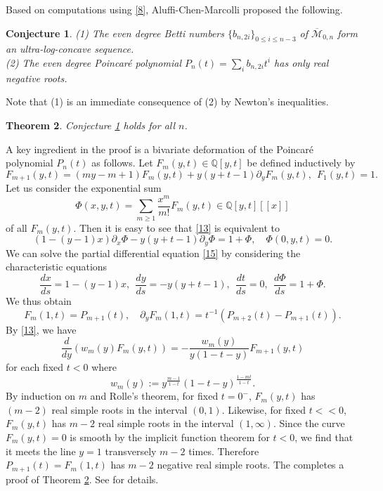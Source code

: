 \documentclass[11pt,letterpaper]{amsart}
\numberwithin{equation}{section}
\newtheorem{theorem}{Theorem}[section]
\newtheorem{conjecture}[theorem]{Conjecture}
\theoremstyle{definition}
\def\QQ{\mathbb{Q}}
\newcommand{\cal}{\mathcal}
\def\cM{{\cal M}}
\def\mzn{\overline{\cM}_{0,n} }
\def\beq{\begin{equation}}
\def\eeq{\end{equation}}
\begin{document}
Based on computations using \eqref{8}, Aluffi-Chen-Marcolli proposed the following.
\begin{conjecture}\label{12} \cite{ACM}
(1) The even degree Betti numbers $\{b_{n,2i}\}_{0\le i\le n-3}$ of $\mzn$ form an ultra-log-concave sequence. \\
(2) The even degree Poincar\'e polynomial $P_n(t)=\sum_i b_{n,2i}t^i$ has only real negative roots.
\end{conjecture}
Note that (1) is an immediate consequence of (2) by Newton's inequalities.

\begin{theorem}\label{14} \cite{BK}
    Conjecture \ref{12} holds for all $n$.
\end{theorem}


A key ingredient in the proof is a bivariate deformation of the Poincar\'e polynomial $P_n(t)$ as follows. Let $F_m(y,t) \in \QQ[y,t]$ be defined inductively by
\beq\label{13} F_{m+1}(y,t)=(my-m+1)F_m(y,t)+y(y+t-1)\partial_yF_m(y,t),\ \  F_1(y,t)=1.\eeq
Let us consider the exponential sum
\beq\label{16} \Phi(x,y,t)=\sum_{m\ge 1} \frac{x^m}{m!}F_m(y,t)\in \QQ[y,t][\![x]\!]\eeq
of all $F_m(y,t)$. Then it is easy to see that \eqref{13} is equivalent to
\beq\label{15}
(1-(y-1)x)\partial_x\Phi-y(y+t-1)\partial_y\Phi=1+\Phi,\quad \Phi(0,y,t)=0.\eeq
We can solve the partial differential equation \eqref{15} by considering the characteristic equations
\beq\label{17}
\frac{dx}{ds}=1-(y-1)x, \ \ \frac{dy}{ds}=-y(y+t-1), \ \ \frac{dt}{ds}=0, \ \  \frac{d\Phi}{ds} = 1+\Phi.
\eeq
We thus obtain
\beq\label{18}
F_m(1,t)=P_{m+1}(t),\quad \partial_yF_m(1,t)=t^{-1}\left( P_{m+2}(t)-P_{m+1}(t)  \right).\eeq
By \eqref{13}, we have
\beq\label{19}
\frac{d}{dy} \left( w_m(y)F_m(y,t)\right)=-\frac{w_m(y)}{y(1-t-y)} F_{m+1}(y,t)\eeq
for each fixed $t<0$ where $$w_m(y):=y^{\frac{m-1}{1-t}}(1-t-y)^{\frac{1-mt}{1-t}}.$$
By induction on $m$ and Rolle's theorem, for fixed $t=0^-$, $F_m(y,t)$ has $(m-2)$ real simple roots in the interval $(0,1)$. Likewise, for fixed $t<\!<0$, $F_m(y,t)$ has $m-2$ real simple roots in the interval $(1,\infty)$. Since the curve $F_m(y,t)=0$ is smooth by the implicit function theorem for $t<0$, we find that it meets the line $y=1$ transversely $m-2$ times. Therefore $P_{m+1}(t)=F_m(1,t)$ has $m-2$ negative real simple roots. The completes a proof of Theorem \ref{14}. See \cite{BK} for details.
\end{document}
